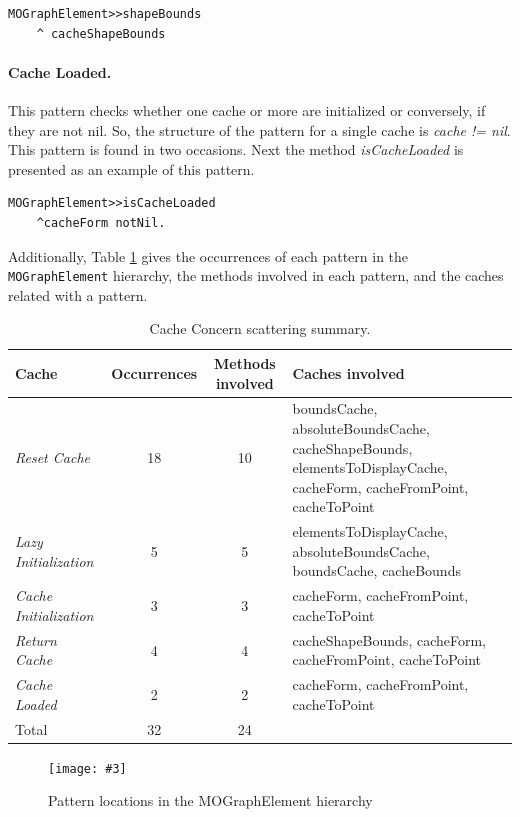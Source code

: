 \documentclass[preprint,10pt]{sigplanconf}
\newcommand{\ct}{\lstinline[backgroundcolor=\color{white},basicstyle=\footnotesize\ttfamily]}
\newcommand{\largefig}[4]{
	\begin{figure}[#1]
		\centering
		\texttt{[image: \#3]}
		\caption{\label{fig:#3}#4}
	\end{figure}}
\begin{document}
\begin{lstlisting} 
MOGraphElement>>shapeBounds  
	^ cacheShapeBounds
\end{lstlisting}

\paragraph{Cache Loaded.} This pattern checks whether one cache or more
are initialized or conversely, if they are not nil. So, the structure of the
pattern for a single cache is \emph{cache != nil}. This pattern is
found in two occasions. Next the method \emph{isCacheLoaded} is presented
as an example of this pattern.

\begin{lstlisting} 
MOGraphElement>>isCacheLoaded 
	^cacheForm notNil. 
\end{lstlisting}


Additionally, Table \ref{tab:Cache-Concern-scattering} gives the occurrences of each pattern in the \ct{MOGraphElement} hierarchy,
the methods involved in each pattern, and the caches related with
a pattern.

%
\begin{table}
\begin{centering}
\begin{tabular}{|p{2.5cm}|c|c|p{3.5cm}|}
\hline 
Cache  & Occurrences  & Methods involved  & Caches involved\tabularnewline
\hline
\hline 
\emph{Reset Cache}  & 18 & 10 & boundsCache, absoluteBoundsCache, cacheShapeBounds, elementsToDisplayCache,
cacheForm, cacheFromPoint, cacheToPoint\tabularnewline
\hline 
\emph{Lazy Initialization}  & 5 & 5 & elementsToDisplayCache, absoluteBoundsCache, boundsCache, cacheBounds\tabularnewline
\hline 
\emph{Cache Initialization}  & 3 & 3 & cacheForm, cacheFromPoint, cacheToPoint\tabularnewline
\hline 
\emph{Return Cache}  & 4 & 4 & cacheShapeBounds, cacheForm, cacheFromPoint, cacheToPoint\tabularnewline
\hline 
\emph{Cache Loaded} & 2 & 2 & cacheForm, cacheFromPoint, cacheToPoint\tabularnewline
\hline 
Total  & 32 & 24 & \multicolumn{1}{c}{}\tabularnewline
\cline{1-3} 
\end{tabular}
\par\end{centering}

\caption{Cache Concern scattering summary.\label{tab:Cache-Concern-scattering}}

\end{table}

\largefig{}{0.6}{PatternLocation}{Pattern locations in the MOGraphElement hierarchy}
\end{document}

